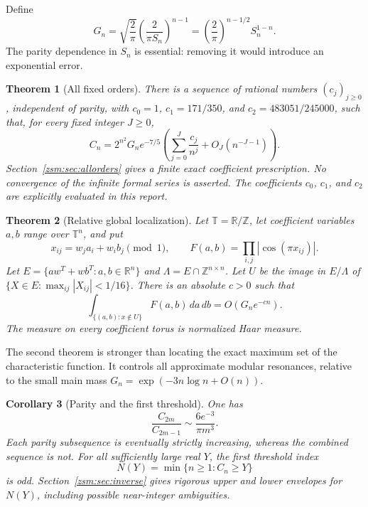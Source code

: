 \documentclass[11pt]{article}
\newtheorem{theorem}{Theorem}[section]
\newtheorem{corollary}[theorem]{Corollary}
\theoremstyle{definition}\newtheorem{definition}[theorem]{Definition}
\theoremstyle{remark}\newtheorem{remark}[theorem]{Remark}
\newcommand{\R}{\mathbb R}
\newcommand{\Z}{\mathbb Z}
\newcommand{\T}{\mathbb T}
\begin{document}
Define
\begin{equation}\label{zsm:eq:G}
 G_n=\sqrt{\frac2\pi}\left(\frac2{\pi S_n}\right)^{n-1}
     =\left(\frac2\pi\right)^{n-1/2}S_n^{1-n}.
\end{equation}
The parity dependence in $S_n$ is essential: removing it would introduce an
exponential error.

\begin{theorem}[All fixed orders]\label{zsm:thm:main}
There is a sequence of rational numbers $(c_j)_{j\ge0}$, independent of parity,
with $c_0=1$, $c_1=171/350$, and $c_2=483051/245000$, such that, for every fixed integer $J\ge0$,
\begin{equation}\label{zsm:eq:main}
 C_n=2^{n^2}G_ne^{-7/5}
 \left(\sum_{j=0}^J\frac{c_j}{n^j}+O_J(n^{-J-1})\right).
\end{equation}
Section~\ref{zsm:sec:allorders} gives a finite exact coefficient prescription. No
convergence of the infinite formal series is asserted. The coefficients $c_0$, $c_1$, and $c_2$
are explicitly evaluated in this report.
\end{theorem}

\begin{theorem}[Relative global localization]\label{zsm:thm:globalintro}
Let $\T=\R/\Z$, let coefficient variables $a,b$ range over $\T^n$, and put
\[
 x_{ij}=w_ja_i+w_ib_j\pmod1,\qquad
 F(a,b)=\prod_{i,j}|\cos(\pi x_{ij})|.
\]
Let $E=\{aw^T+wb^T:a,b\in\R^n\}$ and
$\Lambda=E\cap\Z^{n\times n}$. Let $U$ be the image in $E/\Lambda$ of
$\{X\in E:\max_{ij}|X_{ij}|<1/16\}$. There is an absolute $c>0$ such that
\begin{equation}\label{zsm:eq:globalintro}
 \int_{\{(a,b):x\notin U\}}F(a,b)\,da\,db=O(G_ne^{-cn}).
\end{equation}
The measure on every coefficient torus is normalized Haar measure.
\end{theorem}

The second theorem is stronger than locating the exact maximum set of the
characteristic function. It controls all approximate modular resonances,
relative to the small main mass $G_n=\exp(-3n\log n+O(n))$.

\begin{corollary}[Parity and the first threshold]\label{zsm:cor:thresholdintro}
One has
\begin{equation}\label{zsm:eq:parityratio}
 \frac{C_{2m}}{C_{2m-1}}\sim\frac{6e^{-3}}{\pi m^3}.
\end{equation}
Each parity subsequence is eventually strictly increasing, whereas the
combined sequence is not. For all sufficiently large real $Y$, the first
threshold index
\[
 N(Y)=\min\{n\ge1:C_n\ge Y\}
\]
is odd. Section~\ref{zsm:sec:inverse} gives rigorous upper and lower envelopes for
$N(Y)$, including possible near-integer ambiguities.
\end{corollary}
\end{document}
